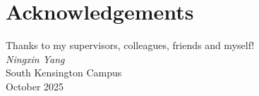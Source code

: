 %

\chapter*{Acknowledgements}


\lipsum[1]

Thanks to my supervisors, colleagues, friends and myself!\\

\vspace{1em}
\mbox{} \hfill \textit{Ningxin Yang}\\
\mbox{} \hfill South Kensington Campus\\
\mbox{} \hfill October 2025
